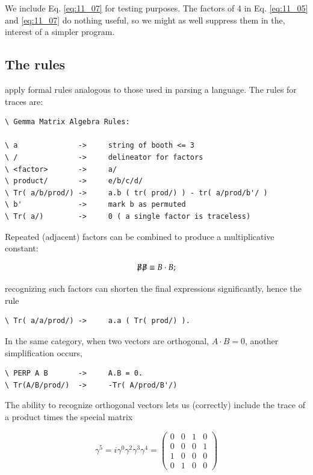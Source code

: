 We include Eq. \eqref{eq:11_07} for testing purposes. The factors of 4 in Eq. \eqref{eq:11_05} and \eqref{eq:11_07} do nothing useful, so we might as well suppress them in the, interest of a simpler program.

\subsection{The rules}
 apply formal rules analogous to those used in parsing a language. The rules for traces are:

\begin{verbatim}
\ Gemma Matrix Algebra Rules:

\ a              ->     string of booth <= 3
\ /              ->     delineator for factors
\ <factor>       ->     a/
\ product/       ->     e/b/c/d/
\ Tr( a/b/prod/) ->     a.b ( tr( prod/) ) - tr( a/prod/b'/ )
\ b'             ->     mark b as permuted
\ Tr( a/)        ->     0 ( a single factor is traceless)
\end{verbatim}

Repeated (adjacent) factors can be combined to produce a multiplicative constant:

\begin{align}\label{eq:11_08}
    \tr{B}\tr{B} \equiv B \cdot B ;
\end{align}

recognizing such factors can shorten the final expressions significantly, hence the rule

\begin{verbatim}
\ Tr( a/a/prod/) ->     a.a ( Tr( prod/) ).
\end{verbatim}

In the same category, when two vectors are orthogonal, $A\cdot B = 0$, another simplification occurs,

\begin{verbatim}
\ PERP A B       ->     A.B = 0.
\ Tr(A/B/prod/)  ->     -Tr( A/prod/B'/)
\end{verbatim}

The ability to recognize orthogonal vectors lets us (correctly)
include the trace of a product times the special matrix

\begin{equation}\label{eq:11_09}
    \gamma^{5} = i \gamma^{0} \gamma^{2} \gamma^{3} \gamma^{4} =
    \begin{pmatrix}
        0 &  0 &  1 &  0 \\
        0 &  0 &  0 &  1 \\
        1 &  0 &  0 &  0 \\
        0 &  1 &  0 &  0 
    \end{pmatrix}
\end{equation}

